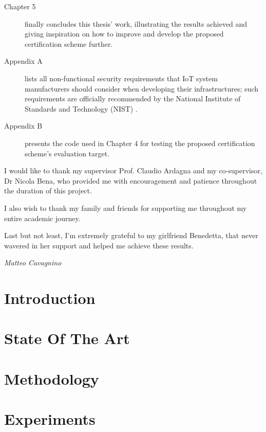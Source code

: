 \documentclass[hidelinks, a4paper, 12pt]{report}
\theoremstyle{definition}
\begin{document}
\begin{description}
    \item[Chapter 5] finally concludes this thesis' work, illustrating the results achieved and giving inspiration on how to improve and develop the proposed certification scheme further.
    
    \item[Appendix A] lists all non-functional security requirements that IoT system manufacturers should consider when developing their infrastructures; such requirements are officially recommended by the National Institute of Standards and Technology (NIST) \cite{nist_req}.
    
    \item[Appendix B] presents the code used in Chapter 4 for testing the proposed certification scheme's evaluation target.
\end{description}
%
%

I would like to thank my supervisor Prof. Claudio Ardagna and my co-supervisor, Dr Nicola Bena, who provided me with encouragement and patience throughout the duration of this project.

I also wish to thank my family and friends for supporting me throughout my entire academic journey.

Last but not least, I’m extremely grateful to my girlfriend Benedetta, that never wavered in her support and helped me achieve these results.
\begin{flushright}
\textit{Matteo Cavagnino}
\end{flushright}
\afterpreface
% 
% 
\chapter{Introduction}
\label{cap1}                        %




\chapter{State Of The Art}
\label{cap2}



\chapter{Methodology}
\label{cap3}


\chapter{Experiments}
\label{cap4}

\end{document}
